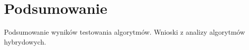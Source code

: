 \chapter{Podsumowanie}
\thispagestyle{chapterBeginStyle}

Podsumowanie wyników testowania algorytmów. Wnioski z analizy algorytmów hybrydowych.
